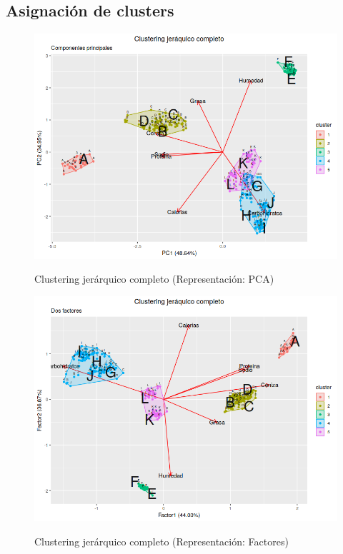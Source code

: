 \documentclass[pdf]{beamer}
\begin{document}
\subsection{Asignación de clusters}

\begin{frame}
\begin{figure}[h]
\centering
	\includegraphics[scale=.35]{images/clusterPCA.png} 
	\label{i_cluster_PCA}
	\caption{Clustering jerárquico completo (Representación: PCA)}
\end{figure}
\end{frame}

\begin{frame}
\begin{figure}[h]
\centering
	\includegraphics[scale=.35]{images/clusterFactores.png} 
	\label{i_cluster_Factores}
	\caption{Clustering jerárquico completo (Representación: Factores)}
\end{figure}
\end{frame}
\end{document}
